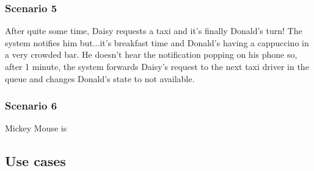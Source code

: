 \documentclass{article}
\begin{document}
\subsubsection{Scenario 5}
After quite some time, Daisy requests a taxi and it's finally Donald's turn! The system notifies him but...it's breakfast time and Donald's having a cappuccino in a very crowded bar. He doesn't hear the notification popping on his phone so, after 1 minute, the system forwards Daisy's request to the next taxi driver in the queue and changes Donald's state to not available.
\subsubsection{Scenario 6}
Mickey Mouse is 

\subsection{Use cases}
\end{document}
